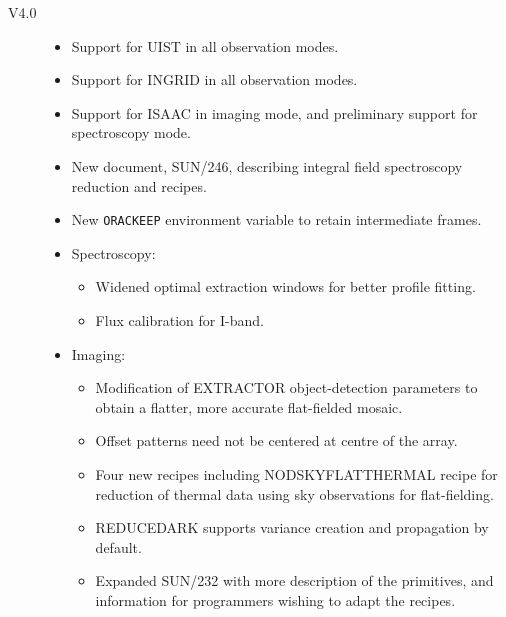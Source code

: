 \documentclass[twoside,11pt]{article}
\newcommand{\xref}[3]{#1}
\renewcommand{\_}{\texttt{\symbol{95}}}
\begin{document}
\begin{description}

\item[V4.0]

\begin{itemize}

\item Support for UIST in all observation modes.

\item Support for INGRID in all observation modes.

\item Support for ISAAC in imaging mode, and preliminary support for
spectroscopy mode.

\item New document, \xref{SUN/246}{sun246}{}, describing integral field
  spectroscopy reduction and recipes.
  
\item New \texttt{ORAC\_KEEP} environment variable to retain intermediate
  frames.

\item Spectroscopy:

\begin{itemize}

\item Widened optimal extraction windows for better profile fitting.

\item Flux calibration for I-band.

\end{itemize}

\item Imaging:

\begin{itemize}

\item Modification of EXTRACTOR object-detection parameters to obtain a
    flatter, more accurate flat-fielded mosaic.

\item Offset patterns need not be centered at centre of the array.

\item Four new recipes including NOD\_SKY\_FLAT\_THERMAL recipe for reduction 
    of thermal data using sky observations for flat-fielding.

\item REDUCE\_DARK supports variance creation and propagation by default.
  
\item Expanded \xref{SUN/232}{sun232}{} with more description of the
  primitives, and information for programmers wishing to adapt the recipes.


\end{itemize}
\end{itemize}
\end{description}
\end{document}
